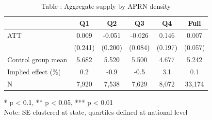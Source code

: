 \begin{table}[t]
\caption*{
{\fontsize{20}{25}\selectfont  Table : Aggregate supply by APRN density\fontsize{12}{15}\selectfont }
} 
\fontsize{12.0pt}{14.0pt}\selectfont
\begin{tabular*}{\linewidth}{@{\extracolsep{\fill}}lccccc}
\toprule
  & Q1 & Q2 & Q3 & Q4 & Full \\ 
\midrule\addlinespace[2.5pt]
ATT & 0.009 & -0.051 & -0.026 & 0.146 & 0.007 \\ 
 & (0.241) & (0.200) & (0.084) & (0.197) & (0.057) \\ 
Control group mean & 5.682 & 5.520 & 5.500 & 4.677 & 5.242 \\ 
Implied effect (\%) & 0.2 & -0.9 & -0.5 & 3.1 & 0.1 \\ 
N & 7,920 & 7,538 & 7,629 & 8,072 & 33,174 \\ 
\bottomrule
\end{tabular*}
\begin{minipage}{\linewidth}
* p < 0.1, ** p < 0.05, *** p < 0.01\\
Note: SE clustered at state, quartiles defined at national level\\
\end{minipage}
\end{table}

